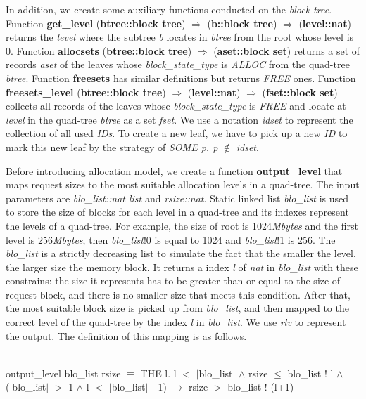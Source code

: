 In addition, we create some auxiliary functions conducted on the \textsl{block tree}. Function \textbf{get\_level} (\textbf{btree::block tree}) $\Rightarrow$ (\textbf{b::block tree}) $\Rightarrow$ (\textbf{level::nat}) returns the \emph{level} where the subtree \emph{b} locates in \emph{btree} from the root whose level is 0. Function \textbf{allocsets} (\textbf{btree::block tree}) $\Rightarrow$ (\textbf{aset::block set}) returns a set of records \emph{aset} of the leaves whose \emph{block\_state\_type} is \emph{ALLOC} from the quad-tree \emph{btree}. Function \textbf{freesets} has similar definitions but returns \emph{FREE} ones. Function \textbf{freesets\_level} (\textbf{btree::block tree}) $\Rightarrow$ (\textbf{level::nat}) $\Rightarrow$ (\textbf{fset::block set}) collects all records of the leaves whose \emph{block\_state\_type} is \emph{FREE} and locate at \emph{level} in the quad-tree \emph{btree} as a set \emph{fset}. We use a notation \emph{idset} to represent the collection of all used \emph{IDs}. To create a new leaf, we have to pick up a new \emph{ID} to mark this new leaf by the strategy of \emph{SOME p. p} $\notin$ \emph{idset}.

Before introducing allocation model, we create a function \textbf{output\_level} that maps request sizes to the most suitable allocation levels in a quad-tree. The input parameters are \emph{blo\_list::nat list} and \emph{rsize::nat}. Static linked list \emph{blo\_list} is used to store the size of blocks for each level in a quad-tree and its indexes represent the levels of a quad-tree. For example, the size of root is 1024\emph{Mbytes} and the first level is 256\emph{Mbytes}, then \emph{blo\_list}!0 is equal to 1024 and \emph{blo\_list}!1 is 256. The \emph{blo\_list} is a strictly decreasing list to simulate the fact that the smaller the level, the larger size the memory block. It returns a index \emph{l} of \emph{nat} in \emph{blo\_list} with these constrains: the size it represents has to be greater than or equal to the size of request block, and there is no smaller size that meets this condition. After that, the most suitable block size is picked up from \emph{blo\_list}, and then mapped to the correct level of the quad-tree by the index \emph{l} in \emph{blo\_list}. We use \emph{rlv} to represent the output. The definition of this mapping is as follows.

\begin{definition}  \\
	output\_level blo\_list rsize $\equiv$ THE l. l $<$ $\vert$blo\_list$\vert$ $\wedge$ rsize $\le$ blo\_list ! l $\wedge$ \\
	\phantom{x} \hspace{10pt} ($\vert$blo\_list$\vert$ $>$ 1 $\wedge$ l $<$ $\vert$blo\_list$\vert$ - 1) $\longrightarrow$ rsize $>$ blo\_list ! (l+1)
\end{definition}

